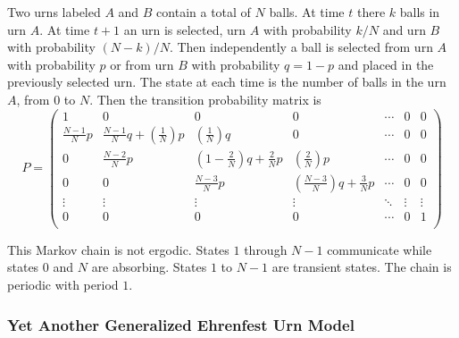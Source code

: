 \documentclass[12pt]{article}
\begin{document}
Two urns labeled \( A \) and \( B \) contain a total of \( N \) balls.
At time \( t \) there \( k \) balls in urn \( A \).  At time \( t + 1 \)
an urn is selected, urn \( A \) with probability \( k/N \) and urn \( B \)
with probability \( (N-k)/N \).  Then independently a ball is selected
from urn \( A \) with probability \( p \) or from urn \( B \) with
probability \( q = 1-p \) and placed in the previously selected urn. The
state at each time is the number of balls in the urn \( A \), from \( 0 \)
to \( N \).  Then the transition probability matrix is
\[
    P =
    \begin{pmatrix}
        1 & 0 & 0 & 0 & \cdots & 0 & 0 \\
        \frac{N-1}{N} p & \frac{N-1}{N} q + \left( \frac{1}{N} \right) p
        & \left( \frac{1}{N} \right) q & 0 & \cdots & 0 & 0 \\
        0 & \frac{N-2}{N} p & \left( 1-\frac{2}{N}\right) q + \frac{2}{N} p
         & \left( \frac{2}{N} \right) p & \cdots & 0 & 0 \\
        0 & 0 & \frac{N-3}{N} p & \left( \frac{N-3}{N}\right) q + \frac{3}{N} p 
        & \cdots & 0 & 0 \\
        \vdots & \vdots & \vdots & \vdots & \ddots & \vdots & \vdots \\
        0 & 0 & 0 & 0 & \cdots & 0 & 1 \\
    \end{pmatrix}
\]

This Markov chain is not ergodic.  States \( 1 \) through \( N-1 \)
communicate while states \( 0 \) and \( N \) are absorbing.  States \( 1
\) to \( N-1 \) are transient states.  The chain is periodic with period
\( 1 \).

\subsubsection*{Yet Another Generalized Ehrenfest Urn Model}
\end{document}
